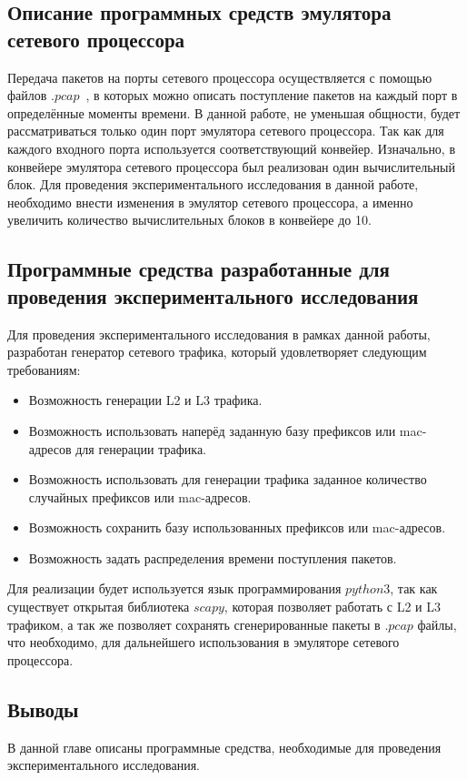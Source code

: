 \documentclass[oneside,final,12pt]{extarticle}
\begin{document}
        \subsection{Описание программных средств эмулятора сетевого процессора}
            Передача пакетов на порты сетевого процессора осуществляется 
            с помощью файлов $.pcap$~\cite{pcap}, в которых можно описать поступление пакетов 
            на каждый порт в определённые моменты времени.
            В данной работе, не уменьшая общности, будет рассматриваться только один порт эмулятора сетевого процессора. Так как для каждого входного
            порта используется соответствующий конвейер. Изначально, в конвейере эмулятора сетевого процессора был реализован один вычислительный блок.
            Для проведения экспериментального исследования в данной работе, необходимо внести изменения в эмулятор сетевого процессора, а именно увеличить количество вычислительных блоков 
            в конвейере до 10.
        \subsection{Программные средства разработанные для проведения экспериментального исследования}
            Для проведения экспериментального исследования в рамках данной работы, разработан генератор сетевого трафика, который удовлетворяет следующим требованиям:
            \begin{itemize}
                \item Возможность генерации L2 и L3 трафика.
                \item Возможность использовать наперёд заданную базу префиксов или mac-адресов для генерации трафика.
                \item Возможность использовать для генерации трафика заданное количество случайных префиксов или mac-адресов.
                \item Возможность сохранить базу использованных префиксов или mac-адресов.
                \item Возможность задать распределения времени поступления пакетов.
            \end{itemize}
            Для реализации будет используется язык программирования $python3$, так как существует открытая библиотека $scapy$, которая позволяет работать с L2 и L3 трафиком,
            а так же позволяет сохранять сгенерированные пакеты в $.pcap$ файлы, что необходимо, для дальнейшего использования в эмуляторе сетевого процессора.
        \subsection{Выводы} 
           В данной главе описаны программные средства, необходимые для проведения экспериментального исследования.
\end{document}
